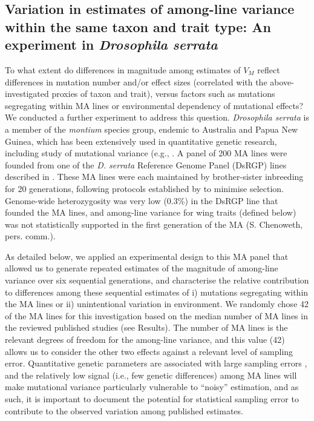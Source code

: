 \subsection{Variation in estimates of among-line variance within the same taxon and trait type: An experiment in \textit{Drosophila serrata}} 
To what extent do differences in magnitude among estimates of $V_M$ reflect differences in mutation number and/or effect sizes (correlated with the above-investigated proxies of taxon and trait), versus factors such as mutations segregating within MA lines or environmental dependency of mutational effects? We conducted a further experiment to address this question. \textit{Drosophila serrata} is a member of the \textit{montium} species group, endemic to Australia and Papua New Guinea, which has been extensively used in quantitative genetic research, including study of mutational variance (e.g., \citealp{McGu13,Hine18, Duga21}. A panel of 200 MA lines were founded from one of the \textit{D. serrata} Reference Genome Panel (DsRGP) lines described in \citet{Redd18}. These MA lines were each maintained by brother-sister inbreeding for 20 generations, following protocols established by \citet{McGu11a} to minimise selection. Genome-wide heterozygosity was very low (0.3\%) in the DsRGP line that founded the MA lines, and among-line variance for wing traits (defined below) was not statistically supported in the first generation of the MA (S. Chenoweth, pers. comm.).\par 

As detailed below, we applied an experimental design to this MA panel that allowed us to generate repeated estimates of the magnitude of among-line variance over six sequential generations, and characterise the relative contribution to differences among these sequential estimates of i) mutations segregating within the MA lines or ii) unintentional variation in environment. We randomly chose 42 of the MA lines for this investigation based on the median number of MA lines in the reviewed published studies (see Results). The number of MA lines is the relevant degrees of freedom for the among-line variance, and this value (42) allows us to consider the other two effects against a relevant level of sampling error. Quantitative genetic parameters are associated with large sampling errors \citep{Klei73,Klei74,Lync98c21}, and the relatively low signal (i.e., few genetic differences) among MA lines will make mutational variance particularly vulnerable to “noisy” estimation, and as such, it is important to document the potential for statistical sampling error to contribute to the observed variation among published estimates.\par

